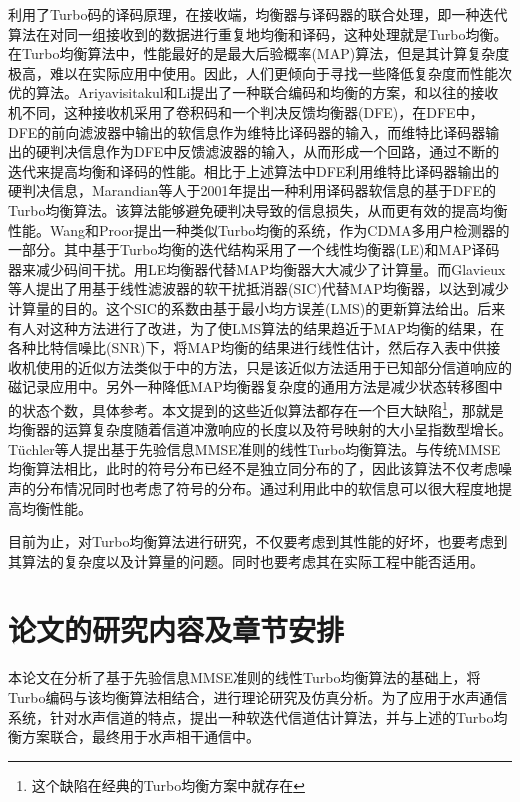 利用了Turbo码的译码原理，在接收端，均衡器与译码器的联合处理，即一种迭代算法在对同一组接收到的数据进行重复地均衡和译码，这种处理就是Turbo均衡\citep{douillard1995,Anastasopoulos1997}。
在Turbo均衡算法中，性能最好的是最大后验概率(MAP)算法\citep{Davis2001}，但是其计算复杂度极高，难以在实际应用中使用。因此，人们更倾向于寻找一些降低复杂度而性能次优的算法。Ariyavisitakul和Li\citep{ariyavisitakul1998}提出了一种联合编码和均衡的方案，和以往的接收机不同，这种接收机采用了卷积码和一个判决反馈均衡器(DFE)，在DFE中，DFE的前向滤波器中输出的软信息作为维特比译码器的输入，而维特比译码器输出的硬判决信息作为DFE中反馈滤波器的输入，从而形成一个回路，通过不断的迭代来提高均衡和译码的性能。相比于上述算法中DFE利用维特比译码器\citep{Joachim1989}输出的硬判决信息，Marandian等人\citep{Marandian}于2001年提出一种利用译码器软信息的基于DFE的Turbo均衡算法。该算法能够避免硬判决导致的信息损失，从而更有效的提高均衡性能。Wang和Proor\citep{wang1999iterative}提出一种类似Turbo均衡的系统，作为CDMA多用户检测器的一部分。其中基于Turbo均衡的迭代结构采用了一个线性均衡器(LE)和MAP译码器来减少码间干扰。用LE均衡器代替MAP均衡器大大减少了计算量。而Glavieux\citep{glavieux1997turbo}等人提出了用基于线性滤波器的软干扰抵消器(SIC)代替MAP均衡器，以达到减少计算量的目的。这个SIC的系数由基于最小均方误差(LMS)的更新算法给出。后来有人对这种方法进行了改进，为了使LMS算法的结果趋近于MAP均衡的结果，在各种比特信噪比(SNR)下，将MAP均衡的结果进行线性估计，然后存入表中供接收机使用\citep{raphaeli2000,wu2000turbo}的近似方法类似于中的方法，只是该近似方法适用于已知部分信道响应的磁记录应用中。另外一种降低MAP均衡器复杂度的通用方法是减少状态转移图中的状态个数，具体参考。本文提到的这些近似算法都存在一个巨大缺陷\footnote{这个缺陷在经典的Turbo均衡方案中就存在}，那就是均衡器的运算复杂度随着信道冲激响应的长度以及符号映射的大小呈指数型增长。T{\"u}chler\citep{Tuchler2002a,Tuchler,Tuchler2011}等人提出基于先验信息MMSE准则的线性Turbo均衡算法。与传统MMSE均衡算法相比，此时的符号分布已经不是独立同分布的了，因此该算法不仅考虑噪声的分布情况同时也考虑了符号的分布。通过利用此中的软信息可以很大程度地提高均衡性能。

目前为止，对Turbo均衡算法进行研究，不仅要考虑到其性能的好坏，也要考虑到其算法的复杂度以及计算量的问题。同时也要考虑其在实际工程中能否适用。
\section{论文的研究内容及章节安排}
本论文在分析了基于先验信息MMSE准则的线性Turbo均衡算法的基础上，将Turbo编码与该均衡算法相结合，进行理论研究及仿真分析。为了应用于水声通信系统，针对水声信道的特点，提出一种软迭代信道估计算法，并与上述的Turbo均衡方案联合，最终用于水声相干通信中。

